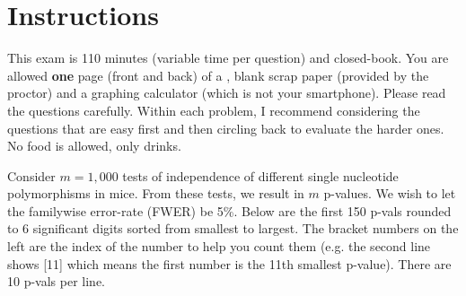 \documentclass[12pt]{article}
\begin{document}
\section*{Instructions}
This exam is 110 minutes (variable time per question) and closed-book. You are allowed \textbf{one} page (front and back) of a , blank scrap paper (provided by the proctor) and a graphing calculator (which is not your smartphone). Please read the questions carefully. Within each problem, I recommend considering the questions that are easy first and then circling back to evaluate the harder ones. No food is allowed, only drinks. %

\pagebreak

\problem Consider $m = 1,000$ tests of independence of different single nucleotide polymorphisms in mice. From these tests, we result in $m$ p-values. We wish to let the familywise error-rate (FWER) be 5\%. Below are the first 150 p-vals rounded to 6 significant digits sorted from smallest to largest. The bracket numbers on the left are the index of the number to help you count them (e.g. the second line shows [11] which means the first number is the 11th smallest p-value). There are 10 p-vals per line.\\
\end{document}
